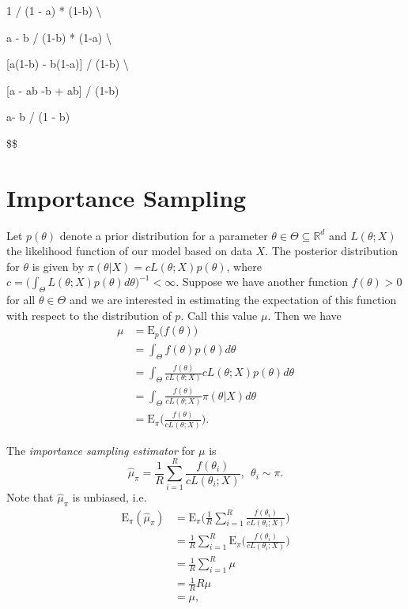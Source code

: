 \documentclass[
  12pt]{article}
\begin{document}
1 / (1 - a) * (1-b) \textbackslash{}

a - b / (1-b) * (1-a) \textbackslash{}

{[}a(1-b) - b(1-a){]} / (1-b) \textbackslash{}

{[}a - ab -b + ab{]} / (1-b)

a- b / (1 - b)

\$\$

\section{Importance Sampling}\label{importance-sampling}

Let \(p(\theta)\) denote a prior distribution for a parameter
\(\theta \in \Theta \subseteq \mathbb{R}^d\) and \(L(\theta; X)\) the
likelihood function of our model based on data \(X\). The posterior
distribution for \(\theta\) is given by
\(\pi(\theta | X) = cL(\theta;X)p(\theta)\), where
\(c = \big(\int_{\Theta} L(\theta;X) p(\theta) d\theta\big)^{-1} < \infty.\)
Suppose we have another function \(f(\theta) >0\) for all
\(\theta \in \Theta\) and we are interested in estimating the
expectation of this function with respect to the distribution of \(p\).
Call this value \(\mu\). Then we have \[
\begin{aligned}
\mu &= \text{E}_p\big(f(\theta)\big) \\
    &= \int_{\Theta} f(\theta)p(\theta) d\theta \\
    &= \int_{\Theta} \frac{f(\theta)}{c L(\theta;X)} c L(\theta;X) p(\theta) d\theta \\
    &= \int_{\Theta} \frac{f(\theta)}{c L(\theta;X)} \pi(\theta | X) d\theta \\
    &= \text{E}_{\pi}\Bigg(\frac{f(\theta)}{c L(\theta;X)}\Bigg).
\end{aligned}
\]

The \emph{importance sampling estimator} for \(\mu\) is \[
\hat{\mu}_{\pi} = \frac{1}{R} \sum_{i=1}^R \frac{f(\theta_i)}{c L(\theta_i;X)}, \> \> \theta_i \sim \pi.
\] Note that \(\hat{\mu}_{\pi}\) is unbiased, i.e.~ \[
\begin{aligned}
\text{E}_{\pi}(\hat{\mu}_{\pi}) &= \text{E}_{\pi}\Bigg(\frac{1}{R} \sum_{i=1}^R \frac{f(\theta_i)}{c L(\theta_i;X)}\Bigg) \\
                                &= \frac{1}{R} \sum_{i=1}^R\text{E}_{\pi}\Bigg(\frac{f(\theta_i)}{c L(\theta_i;X)}\Bigg) \\
                                &= \frac{1}{R} \sum_{i=1}^R \mu \\
                                &= \frac{1}{R} R\mu \\
                                &= \mu,
\end{aligned}
\]
\end{document}
